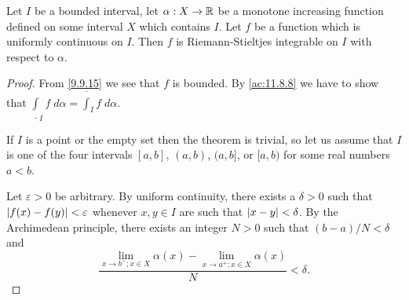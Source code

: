 \begin{ac}\label{ac:11.8.15}
  Let \(I\) be a bounded interval, let \(\alpha : X \to \mathbb{R}\) be a monotone increasing function defined on some interval \(X\) which contains \(I\).
  Let \(f\) be a function which is uniformly continuous on \(I\).
  Then \(f\) is Riemann-Stieltjes integrable on \(I\) with respect to \(\alpha\).
\end{ac}

\begin{proof}
  From \cref{9.9.15} we see that \(f\) is bounded.
  By \cref{ac:11.8.8} we have to show that \(\underline{\int}_I f \; d \alpha = \overline{\int}_I f \; d \alpha\).

  If \(I\) is a point or the empty set then the theorem is trivial, so let us assume that \(I\) is one of the four intervals \([a, b]\), \((a, b)\), \((a, b]\), or \([a, b)\) for some real numbers \(a < b\).

  Let \(\varepsilon > 0\) be arbitrary.
  By uniform continuity, there exists a \(\delta > 0\) such that \(\left\lvert f(x) - f(y)\right\rvert < \varepsilon\) whenever \(x, y \in I\) are such that \(\left\lvert x - y\right\rvert < \delta\).
  By the Archimedean principle, there exists an integer \(N > 0\) such that \((b - a) / N < \delta\) and
  \[
    \dfrac{\lim_{x \to b^- ; x \in X} \alpha(x) - \lim_{x \to a^+ ; x \in X} \alpha(x)}{N} < \delta.
  \]


\end{proof}
